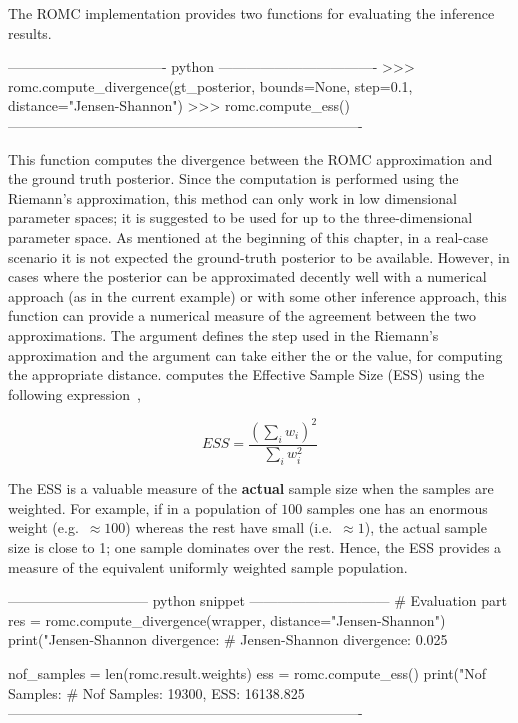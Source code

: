 The ROMC implementation provides two functions for evaluating the
inference results.

\begin{Code}
---------------------------------- python ----------------------------------  
>>> romc.compute_divergence(gt_posterior,
                            bounds=None,
                            step=0.1,
                            distance="Jensen-Shannon")
>>> romc.compute_ess()
----------------------------------------------------------------------------
\end{Code}

\noindent
This function computes the divergence between the ROMC approximation
and the ground truth posterior. Since the computation is performed
using the Riemann's approximation, this method can only work in low
dimensional parameter spaces; it is suggested to be used for up to the
three-dimensional parameter space. As mentioned at the beginning of
this chapter, in a real-case scenario it is not expected the
ground-truth posterior to be available. However, in cases where the
posterior can be approximated decently well with a numerical approach
(as in the current example) or with some other inference approach,
this function can provide a numerical measure of the agreement between
the two approximations. The argument  defines the step used
in the Riemann's approximation and the argument  can
take either the  or the 
value, for computing the appropriate distance. 
computes the Effective Sample Size (ESS) using the following
expression~\cite{Sudman1967},

\begin{equation} \label{eq:ESS}
  ESS = \frac{(\sum_i w_i)^2}{\sum_i w_i^2}
\end{equation}

The ESS is a valuable measure of the \textbf{actual} sample size when
the samples are weighted. For example, if in a population of $100$
samples one has an enormous weight (e.g.\ $\approx 100$) whereas the
rest have small (i.e.\ $\approx 1$), the actual sample size is close
to 1; one sample dominates over the rest. Hence, the ESS provides a
measure of the equivalent uniformly weighted sample population.

\begin{Code}
------------------------------ python snippet ------------------------------  
  # Evaluation part
  res = romc.compute_divergence(wrapper, distance="Jensen-Shannon")                                 
  print("Jensen-Shannon divergence: %
  # Jensen-Shannon divergence: 0.025

  nof_samples = len(romc.result.weights)
  ess = romc.compute_ess()
  print("Nof Samples: %
  # Nof Samples: 19300, ESS: 16138.825
----------------------------------------------------------------------------  
\end{Code}

